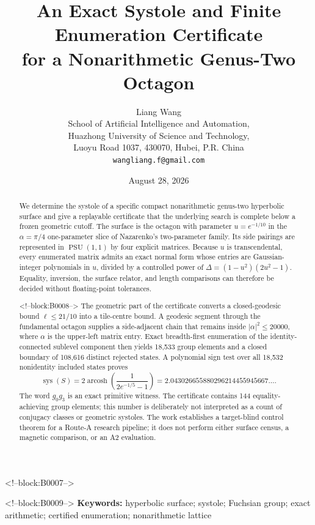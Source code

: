 \documentclass[11pt,a4paper]{article}
\title{An Exact Systole and Finite Enumeration Certificate\\
for a Nonarithmetic Genus-Two Octagon}
\author{Liang Wang\\
\small School of Artificial Intelligence and Automation,\\
\small Huazhong University of Science and Technology,\\
\small Luoyu Road 1037, 430070, Hubei, P.R. China\\
\small \texttt{wangliang.f@gmail.com}}
\date{August 28, 2026}
\theoremstyle{definition}
\newcommand{\PSU}{\operatorname{PSU}}
\newcommand{\arcosh}{\operatorname{arcosh}}
\newcommand{\sys}{\operatorname{sys}}
\newcommand{\length}{\ell}
\begin{document}
\maketitle

<!--block:B0007-->
\begin{abstract}
We determine the systole of a specific compact nonarithmetic genus-two
hyperbolic surface and give a replayable certificate that the underlying
search is complete below a frozen geometric cutoff.  The surface is the
octagon with parameter \(u=e^{-1/10}\) in the \(\alpha=\pi/4\)
one-parameter slice of Nazarenko's two-parameter family.
Its side pairings are represented in \(\PSU(1,1)\) by four explicit matrices.
Because \(u\) is transcendental, every enumerated matrix admits an exact
normal form whose entries are Gaussian-integer polynomials in \(u\), divided
by a controlled power of
\(\Delta=(1-u^2)(2u^2-1)\).  Equality, inversion, the surface relator, and
length comparisons can therefore be decided without floating-point
tolerances.

<!--block:B0008-->
The geometric part of the certificate converts a closed-geodesic bound
\(\length\leq21/10\) into a tile-centre bound.  A geodesic segment through the
fundamental octagon supplies a side-adjacent chain that remains inside
\(\lvert\alpha\rvert^2\leq20000\), where \(\alpha\) is the upper-left matrix
entry.  Exact breadth-first enumeration of the identity-connected sublevel
component then yields 18,533 group elements and a closed boundary of 108,616
distinct rejected states.  A polynomial sign test over all 18,532
nonidentity included states proves
\[
  \sys(S)=2\arcosh\!\left(\frac{1}{2e^{-1/5}-1}\right)
  =2.043026655880296214455945667\ldots .
\]
The word \(g_0g_3\) is an exact primitive witness.  The certificate contains
144 equality-achieving group elements; this number is deliberately not
interpreted as a count of conjugacy classes or geometric systoles.  The work
establishes a target-blind control theorem for a Route-A research pipeline;
it does not perform either surface census, a magnetic comparison, or an A2
evaluation.
\end{abstract}

<!--block:B0009-->
\noindent\textbf{Keywords:} hyperbolic surface; systole; Fuchsian group;
exact arithmetic; certified enumeration; nonarithmetic lattice
\end{document}
